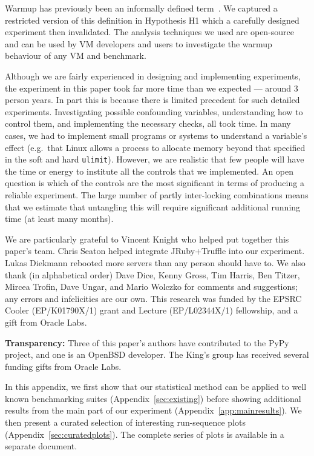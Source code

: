 \documentclass[acmsmall]{acmart}\settopmatter{printfolios=true}
\begin{document}
Warmup has previously been an informally defined term~\cite{seaton15phd}. We
captured a restricted version of this definition in Hypothesis H1 which
a carefully designed experiment then invalidated. The analysis
techniques we used are open-source and can be used by VM developers and users to investigate the
warmup behaviour of any VM and benchmark.

Although we are fairly experienced in designing and implementing
experiments, the experiment in this paper took far more time than we expected
--- around 3 person years. In part this is because there is limited precedent for such detailed
experiments. Investigating possible confounding variables, understanding how to
control them, and implementing the necessary checks, all took time. In many
cases, we had to implement small programs or systems to understand a variable's
effect (e.g.~that Linux allows a process to allocate memory beyond that
specified in the soft and hard \texttt{ulimit}). However, we are realistic that
few people will have the time or energy to institute all the controls that we
implemented. An open question is which of the controls are the most significant
in terms of producing a reliable experiment. The large number of partly
inter-locking combinations means that we estimate that untangling this will
require significant additional running time (at least many months).


\begin{acks}
We are particularly grateful to Vincent Knight who helped put together this
paper's team. Chris Seaton helped integrate JRuby+Truffle into our experiment.
Lukas Diekmann rebooted more servers than any person should have to.
We also thank (in alphabetical order) Dave Dice, Kenny Gross, Tim Harris, Ben
Titzer, Mircea Trofin, Dave Ungar, and Mario Wolczko for comments and suggestions; any
errors and infelicities are our own. This research was funded by the EPSRC
Cooler (EP/K01790X/1) grant and Lecture (EP/L02344X/1) fellowship,
and a gift from Oracle Labs.

\textbf{Transparency:} Three of this paper's authors have contributed
to the PyPy project, and one is an OpenBSD developer. The
King's group has received several funding gifts from Oracle Labs.
\end{acks}




\clearpage

\appendix

\noindent In this appendix, we first show that our statistical method
can be applied to well known benchmarking suites (Appendix~\ref{sec:existing})
before showing additional results from the main part of our experiment
(Appendix~\ref{app:mainresults}). We
then present a curated selection of interesting run-sequence
plots (Appendix~\ref{sec:curatedplots}). The complete series of plots is available in a separate
document.
\end{document}
